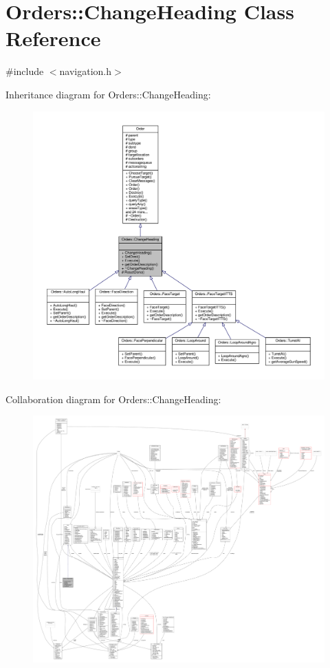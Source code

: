 \hypertarget{classOrders_1_1ChangeHeading}{}\section{Orders\+:\+:Change\+Heading Class Reference}
\label{classOrders_1_1ChangeHeading}


{\ttfamily \#include $<$navigation.\+h$>$}



Inheritance diagram for Orders\+:\+:Change\+Heading\+:
\nopagebreak
\begin{figure}[H]
\begin{center}
\leavevmode
\includegraphics[width=350pt]{d7/ddc/classOrders_1_1ChangeHeading__inherit__graph}
\end{center}
\end{figure}


Collaboration diagram for Orders\+:\+:Change\+Heading\+:
\nopagebreak
\begin{figure}[H]
\begin{center}
\leavevmode
\includegraphics[width=350pt]{d5/d7a/classOrders_1_1ChangeHeading__coll__graph}
\end{center}
\end{figure}
